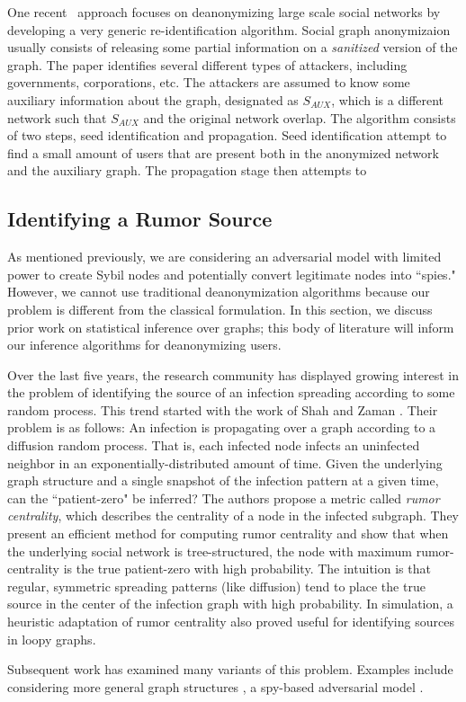 \documentclass[10pt, twocolumn]{article}
\begin{document}
One recent~\cite{narayanan2009anonymizing} approach focuses on deanonymizing large scale social networks by developing a very generic re-identification algorithm. Social graph anonymizaion usually consists of releasing some partial information on a \emph{sanitized} version of the graph. 
The paper identifies several different types of attackers, including governments, corporations, etc. The attackers are assumed to know some auxiliary information about the graph, designated as $S_{AUX}$, which is a different network such that $S_{AUX}$ and the original network overlap. The algorithm consists of two steps, seed identification and propagation. Seed identification attempt to find a small amount of users that are present both in the anonymized network and the auxiliary graph. The propagation stage then attempts to 

\subsection{Identifying a Rumor Source}
As mentioned previously, we are considering an adversarial model with limited power to create Sybil nodes and potentially convert legitimate nodes into ``spies."
However, we cannot use traditional deanonymization algorithms because our problem is different from the classical formulation. 
In this section, we discuss prior work on statistical inference over graphs; this body of literature will inform our inference algorithms for deanonymizing users.

Over the last five years, the research community has displayed growing interest in the problem of identifying the source of an infection spreading according to some random process. 
This trend started with the work of Shah and Zaman \cite{shah2011rumors}. Their problem is as follows: An infection is propagating over a graph according to a diffusion random process. That is, each infected node infects an uninfected neighbor in an exponentially-distributed amount of time. Given the underlying graph structure and a single snapshot of the infection pattern at a given time, can the ``patient-zero" be inferred? The authors propose a metric called \emph{rumor centrality}, which describes the centrality of a node in the infected subgraph. They present an efficient method for computing rumor centrality and show that when the underlying social network is tree-structured, the node with maximum rumor-centrality is the true patient-zero with high probability. The intuition is that regular, symmetric spreading patterns (like diffusion) tend to place the true source in the center of the infection graph with high probability. 
In simulation, a heuristic adaptation of rumor centrality also proved useful for identifying sources in loopy graphs.

Subsequent work has examined many variants of this problem. Examples include considering more general graph structures \cite{shah2012rumor}, a spy-based adversarial model \cite{pinto2012locating,luo2013identify}.




\end{document}
